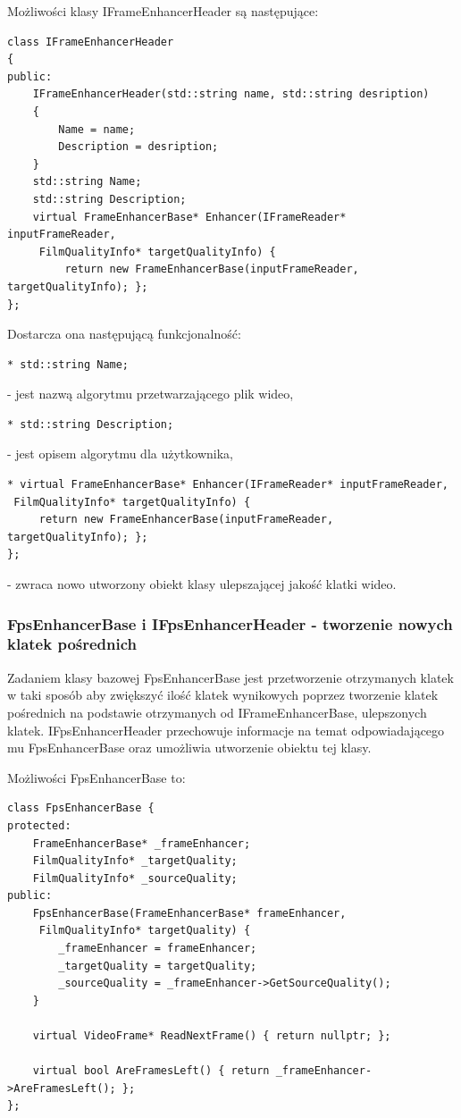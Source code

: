 \documentclass[twoside]{projektInzynierskiMS}
\begin{document}
Możliwości klasy IFrameEnhancerHeader są następujące:
\begin{verbatim}
class IFrameEnhancerHeader
{
public:
	IFrameEnhancerHeader(std::string name, std::string desription)
	{
		Name = name;
		Description = desription;
	}
	std::string Name;
	std::string Description;
	virtual FrameEnhancerBase* Enhancer(IFrameReader* inputFrameReader,
	 FilmQualityInfo* targetQualityInfo) { 
	     return new FrameEnhancerBase(inputFrameReader, targetQualityInfo); };
};
\end{verbatim}

Dostarcza ona następującą funkcjonalność:
\begin{verbatim}
* std::string Name;
\end{verbatim}
 - jest nazwą algorytmu przetwarzającego plik wideo,
 \begin{verbatim}
* std::string Description;
\end{verbatim}
 - jest opisem algorytmu dla użytkownika,
\begin{verbatim}
* virtual FrameEnhancerBase* Enhancer(IFrameReader* inputFrameReader,
 FilmQualityInfo* targetQualityInfo) { 
     return new FrameEnhancerBase(inputFrameReader, targetQualityInfo); };
};
\end{verbatim} 
 - zwraca nowo utworzony obiekt klasy ulepszającej jakość klatki wideo.

\subsubsection{FpsEnhancerBase i IFpsEnhancerHeader - tworzenie nowych klatek pośrednich}
Zadaniem klasy bazowej FpsEnhancerBase jest przetworzenie otrzymanych klatek w taki sposób aby zwiększyć ilość klatek wynikowych poprzez tworzenie klatek pośrednich na podstawie otrzymanych od IFrameEnhancerBase, ulepszonych klatek. IFpsEnhancerHeader przechowuje informacje na temat odpowiadającego mu FpsEnhancerBase oraz umożliwia utworzenie obiektu tej klasy.

Możliwości FpsEnhancerBase to:

\begin{verbatim}
class FpsEnhancerBase {
protected:
    FrameEnhancerBase* _frameEnhancer;
    FilmQualityInfo* _targetQuality;
    FilmQualityInfo* _sourceQuality;
public:
    FpsEnhancerBase(FrameEnhancerBase* frameEnhancer,
     FilmQualityInfo* targetQuality) {
        _frameEnhancer = frameEnhancer;
        _targetQuality = targetQuality;
        _sourceQuality = _frameEnhancer->GetSourceQuality();
    }

    virtual VideoFrame* ReadNextFrame() { return nullptr; };

    virtual bool AreFramesLeft() { return _frameEnhancer->AreFramesLeft(); };
};
\end{verbatim}
\end{document}

